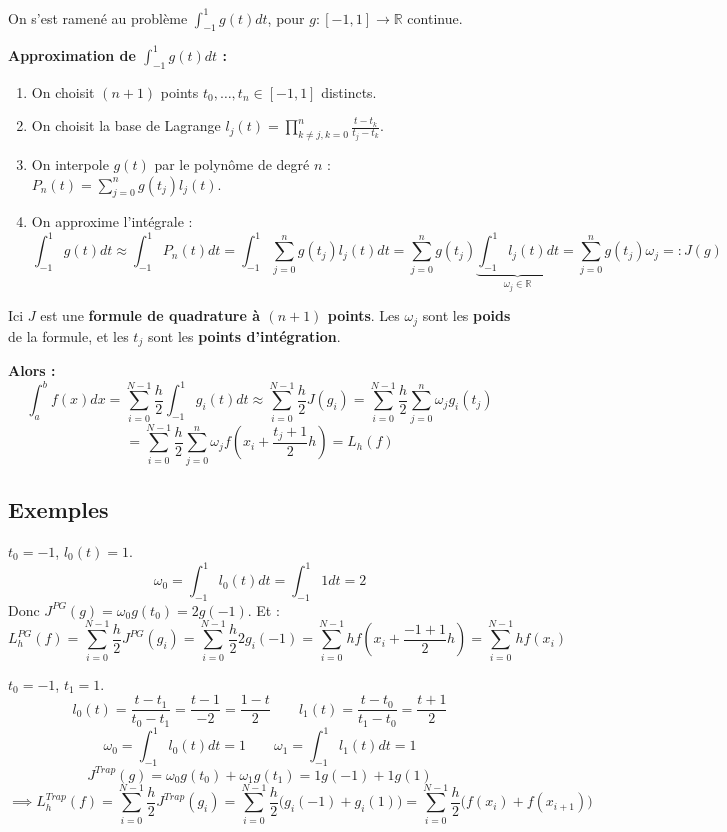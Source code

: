 On s'est ramené au problème $\int_{-1}^1 g(t)dt$, pour $g : [-1, 1] \to \mathbb{R}$ continue.

\textbf{Approximation de $\int_{-1}^1 g(t)dt$ :}
\begin{enumerate}
    \item On choisit $(n+1)$ points $t_0, \dots, t_n \in [-1, 1]$ distincts.
    \item On choisit la base de Lagrange $l_j(t) = \prod_{k \neq j, k=0}^n \frac{t - t_k}{t_j - t_k}$.
    \item On interpole $g(t)$ par le polynôme de degré $n$ : $P_n(t) = \sum_{j=0}^n g(t_j)l_j(t)$.
    \item On approxime l'intégrale :
    $$\int_{-1}^{1} g(t)dt \approx \int_{-1}^{1} P_n(t)dt = \int_{-1}^{1} \sum_{j=0}^n g(t_j)l_j(t)dt = \sum_{j=0}^n g(t_j) \underbrace{\int_{-1}^{1} l_j(t)dt}_{\omega_j \in \mathbb{R}} = \sum_{j=0}^n g(t_j)\omega_j =: J(g)$$
\end{enumerate}

Ici $J$ est une \textbf{formule de quadrature à $(n+1)$ points}.
Les $\omega_j$ sont les \textbf{poids} de la formule, et les $t_j$ sont les \textbf{points d'intégration}.

\textbf{Alors :}
$$\int_a^b f(x)dx = \sum_{i=0}^{N-1} \frac{h}{2} \int_{-1}^{1} g_i(t)dt \approx \sum_{i=0}^{N-1} \frac{h}{2} J(g_i) = \sum_{i=0}^{N-1} \frac{h}{2} \sum_{j=0}^n \omega_j g_i(t_j)$$
$$= \sum_{i=0}^{N-1} \frac{h}{2} \sum_{j=0}^n \omega_j f\left(x_i + \frac{t_j+1}{2}h\right) = L_h(f)$$

\subsection{Exemples}

\begin{exemple}
$t_0 = -1$, $l_0(t) = 1$.
$$\omega_0 = \int_{-1}^1 l_0(t)dt = \int_{-1}^1 1 dt = 2$$
Donc $J^{PG}(g) = \omega_0 g(t_0) = 2 g(-1)$.
Et :
$$L_h^{PG}(f) = \sum_{i=0}^{N-1} \frac{h}{2} J^{PG}(g_i) = \sum_{i=0}^{N-1} \frac{h}{2} 2 g_i(-1) = \sum_{i=0}^{N-1} h f\left(x_i + \frac{-1+1}{2}h\right) = \sum_{i=0}^{N-1} h f(x_i)$$
\end{exemple}

\begin{exemple}
$t_0 = -1$, $t_1 = 1$.
$$l_0(t) = \frac{t - t_1}{t_0 - t_1} = \frac{t - 1}{-2} = \frac{1 - t}{2} \qquad l_1(t) = \frac{t - t_0}{t_1 - t_0} = \frac{t + 1}{2}$$
$$\omega_0 = \int_{-1}^1 l_0(t)dt = 1 \qquad \omega_1 = \int_{-1}^1 l_1(t)dt = 1$$
$$J^{Trap}(g) = \omega_0 g(t_0) + \omega_1 g(t_1) = 1 g(-1) + 1 g(1)$$
$$\implies L_h^{Trap}(f) = \sum_{i=0}^{N-1} \frac{h}{2} J^{Trap}(g_i) = \sum_{i=0}^{N-1} \frac{h}{2} \big( g_i(-1) + g_i(1) \big) = \sum_{i=0}^{N-1} \frac{h}{2} \big( f(x_i) + f(x_{i+1}) \big)$$
\end{exemple}

